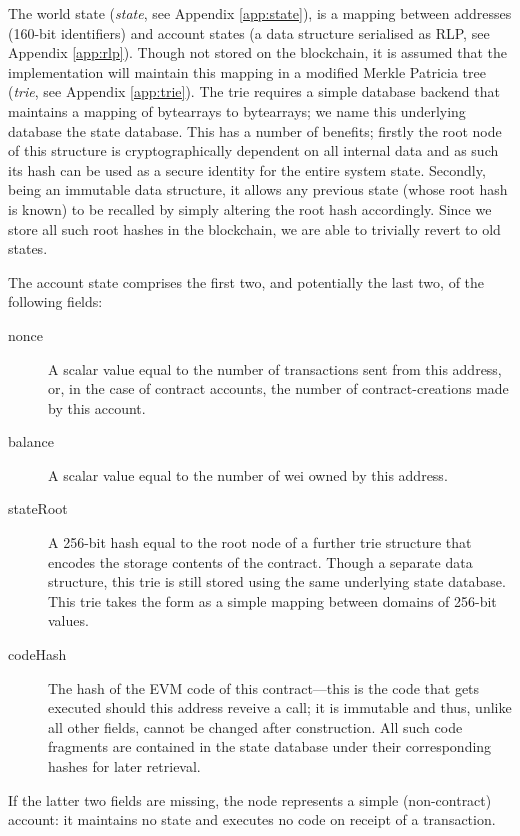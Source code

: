 \documentclass[9pt,oneside]{amsart}
\begin{document}
\begin{multicols}{2}
The world state (\textit{state}, see Appendix \ref{app:state}), is a mapping between addresses (160-bit identifiers) and account states (a data structure serialised as RLP, see Appendix \ref{app:rlp}). Though not stored on the blockchain, it is assumed that the implementation will maintain this mapping in a modified Merkle Patricia tree (\textit{trie}, see Appendix \ref{app:trie}). The trie requires a simple database backend that maintains a mapping of bytearrays to bytearrays; we name this underlying database the state database. This has a number of benefits; firstly the root node of this structure is cryptographically dependent on all internal data and as such its hash can be used as a secure identity for the entire system state. Secondly, being an immutable data structure, it allows any previous state (whose root hash is known) to be recalled by simply altering the root hash accordingly. Since we store all such root hashes in the blockchain, we are able to trivially revert to old states.

The account state comprises the first two, and potentially the last two, of the following fields:

\begin{description}
\item[nonce] A scalar value equal to the number of transactions sent from this address, or, in the case of contract accounts, the number of contract-creations made by this account.
\item[balance] A scalar value equal to the number of wei owned by this address.
\item[stateRoot] A 256-bit hash equal to the root node of a further trie structure that encodes the storage contents of the contract. Though a separate data structure, this trie is still stored using the same underlying state database. This trie takes the form as a simple mapping between domains of 256-bit values.
\item[codeHash] The hash of the EVM code of this contract---this is the code that gets executed should this address reveive a call; it is immutable and thus, unlike all other fields, cannot be changed after construction. All such code fragments are contained in the state database under their corresponding hashes for later retrieval.
\end{description}

If the latter two fields are missing, the node represents a simple (non-contract) account: it maintains no state and executes no code on receipt of a transaction.


\end{multicols}
\end{document}
